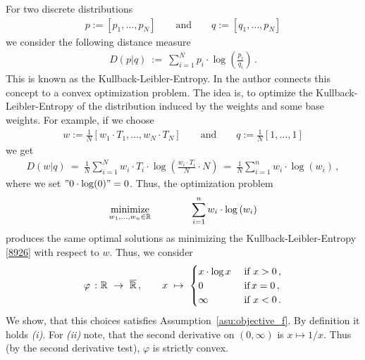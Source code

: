 \begin{example}
  For two discrete distributions
  \begin{gather*}
    p:=[p_1,\ldots,p_N]
    \qquad
    \text{and}
    \qquad
    q:=[q_1,\ldots,p_N]
  \end{gather*}
  we consider the following distance measure
  \begin{gather*}
   D(p|q)
   \ 
   :=
   \ 
   \sum_{i=1}^{N} 
   p_i
   \cdot
   \log
   \left( 
     \frac{p_i}{q_i}
   \right)
   \,.
  \end{gather*}
  This is known as the Kullback-Leibler-Entropy.
  In \cite[§3.1]{Hainmueller2012} the author connects this concept to a convex optimization problem.
  The idea is, to optimize the Kullback-Leibler-Entropy of the distribution induced by the weights and some base weights.
  For example, if we choose
  \begin{gather*}
    w:=
    \frac{1}{N}[w_1\cdot T_1,\ldots,w_N\cdot T_N]
    \qquad
    \text{and}
    \qquad
    q:=\frac{1}{N}[1,\ldots,1]
  \end{gather*}
  we get
  \begin{align}
    \label{8926}
   D(w|q)
   \ 
   =
   \ 
   \frac{1}{N}
   \sum_{i=1}^{N} 
w_i\cdot T_i
   \cdot
   \log
   \left( 
     \frac{w_i\cdot T_i}{N}\cdot N
   \right)
   \ 
   =
   \ 
   \frac{1}{N}
   \sum_{i=1}^{n} 
w_i
   \cdot
   \log
   \left( 
     w_i
   \right)
   \,,
  \end{align}
  where we set $"0\cdot \log(0)"=0$. Thus, the optimization problem
  \begin{gather*}
    \underset{w_1, \ldots, w_n \in \mathbb{R}}
    {\text{minimize}}
    \qquad\qquad
    \sum_{i = 1}^{n} 
w_i
   \cdot
   \log
   \left( 
     w_i
   \right)
  \end{gather*}
  produces the same optimal solutions as minimizing the Kullback-Leibler-Entropy \eqref{8926} with respect to $w$.
Thus, we consider 
\begin{gather*}
  \varphi
  \ 
  \colon
  \R
  \ 
  \to
  \ 
  \overline{\R}
  \,,
  \qquad
  x
  \ 
  \mapsto
  \ 
  \begin{cases}
    x\cdot \log x\ &\text{if}\ x>0\,, \\
    0 \ &\text{if}\, x=0\,,\\
    \infty\ &\text{if}\ x<0\,.
  \end{cases}
\end{gather*}
We show, that this choices satisfies Assumption~\ref{asu:objective_f}.
By definition it holds \textit{(i)}.
For \textit{(ii)} note, that the second derivative on $(0,\infty)$ is $x\mapsto 1/x$. Thus (by the second derivative test), $\varphi$ is strictly convex.

\end{example}

